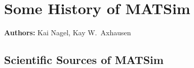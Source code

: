 \chapter{Some History of MATSim}
\label{ch:history}

\hfill \textbf{Authors:} Kai Nagel, Kay W.\ Axhausen


%
%


\section{Scientific Sources of MATSim} %
\label{sec:streams}

